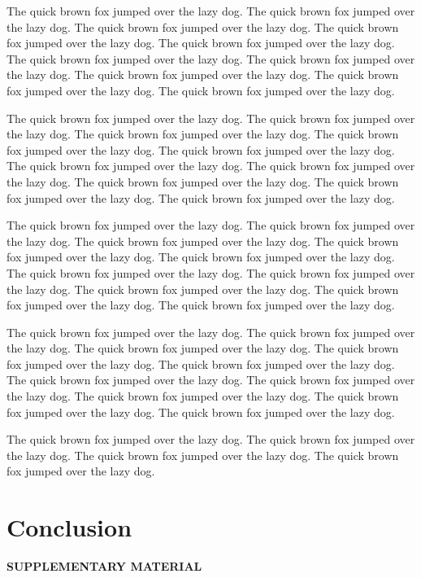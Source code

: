 \documentclass[12pt]{article}
\begin{document}
The quick brown fox jumped over the lazy dog.
The quick brown fox jumped over the lazy dog.
The quick brown fox jumped over the lazy dog.
The quick brown fox jumped over the lazy dog.
The quick brown fox jumped over the lazy dog.
The quick brown fox jumped over the lazy dog.
The quick brown fox jumped over the lazy dog.
The quick brown fox jumped over the lazy dog.
The quick brown fox jumped over the lazy dog.
The quick brown fox jumped over the lazy dog.

The quick brown fox jumped over the lazy dog.
The quick brown fox jumped over the lazy dog.
The quick brown fox jumped over the lazy dog.
The quick brown fox jumped over the lazy dog.
The quick brown fox jumped over the lazy dog.
The quick brown fox jumped over the lazy dog.
The quick brown fox jumped over the lazy dog.
The quick brown fox jumped over the lazy dog.
The quick brown fox jumped over the lazy dog.
The quick brown fox jumped over the lazy dog.

The quick brown fox jumped over the lazy dog.
The quick brown fox jumped over the lazy dog.
The quick brown fox jumped over the lazy dog.
The quick brown fox jumped over the lazy dog.
The quick brown fox jumped over the lazy dog.
The quick brown fox jumped over the lazy dog.
The quick brown fox jumped over the lazy dog.
The quick brown fox jumped over the lazy dog.
The quick brown fox jumped over the lazy dog.
The quick brown fox jumped over the lazy dog.

The quick brown fox jumped over the lazy dog.
The quick brown fox jumped over the lazy dog.
The quick brown fox jumped over the lazy dog.
The quick brown fox jumped over the lazy dog.
The quick brown fox jumped over the lazy dog.
The quick brown fox jumped over the lazy dog.
The quick brown fox jumped over the lazy dog.
The quick brown fox jumped over the lazy dog.
The quick brown fox jumped over the lazy dog.
The quick brown fox jumped over the lazy dog.

The quick brown fox jumped over the lazy dog.
The quick brown fox jumped over the lazy dog.
The quick brown fox jumped over the lazy dog.
The quick brown fox jumped over the lazy dog.



\section{Conclusion}
\label{sec:conc}


\bigskip
\begin{center}
{\large\bf SUPPLEMENTARY MATERIAL}
\end{center}
\end{document}
